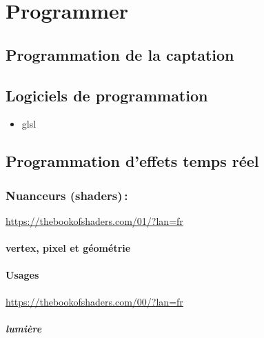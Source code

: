 \documentclass[
  french,
]{book}
\providecommand{\tightlist}{%
  \setlength{\itemsep}{0pt}\setlength{\parskip}{0pt}}
\begin{document}
\hypertarget{programmer}{%
\chapter{Programmer}\label{programmer}}

\hypertarget{programmer_grab}{%
\section{Programmation de la captation}\label{programmer_grab}}

\hypertarget{programmer_logiciels}{%
\section{Logiciels de programmation}\label{programmer_logiciels}}

\begin{itemize}
\tightlist
\item
  glsl
\end{itemize}

\hypertarget{programmation-deffets-temps-ruxe9el}{%
\section{Programmation d'effets temps réel}\label{programmation-deffets-temps-ruxe9el}}

\hypertarget{nuanceurs-shaders}{%
\subsection{Nuanceurs (shaders)\,:}\label{nuanceurs-shaders}}

\url{https://thebookofshaders.com/01/?lan=fr}

\hypertarget{vertex-pixel-et-guxe9omuxe9trie}{%
\subsubsection{vertex, pixel et géométrie}\label{vertex-pixel-et-guxe9omuxe9trie}}

\hypertarget{usages-2}{%
\subsubsection{Usages}\label{usages-2}}

\url{https://thebookofshaders.com/00/?lan=fr}

\hypertarget{lumiuxe8re}{%
\paragraph{lumière}\label{lumiuxe8re}}
\end{document}
